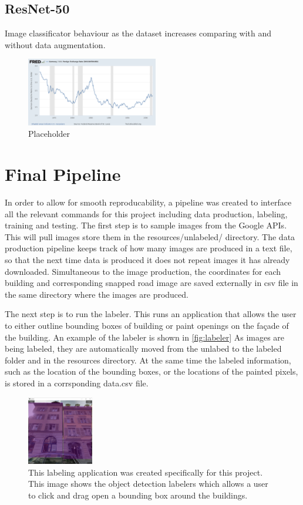 \documentclass[10pt,conference,compsocconf]{IEEEtran}
\begin{document}
\subsection{ResNet-50}
Image classificator behaviour as the dataset increases comparing with and without data augmentation.
\begin{figure}[h!]
  \centering
  \includegraphics[width=\columnwidth, height=30mm]{download.png}
  \vspace{-5mm}
  \caption{Placeholder}
  \label{fig:third}
\end{figure}

\section{Final Pipeline}
In order to allow for smooth reproducability, a pipeline was created to interface all the relevant commands for this project including data production, labeling, training and testing. The first step is to sample images from the Google APIs. This will pull images store them in the resources/unlabeled/ directory. The data production pipeline keeps track of how many images are produced in a text file, so that the next time data is produced it does not repeat images it has already downloaded. Simultaneous to the image production, the coordinates for each building and corresponding snapped road image are saved externally in csv file in the same directory where the images are produced.  

The next step is to run the labeler. This runs an application that allows the user to either outline bounding boxes of building or paint openings on the façade of the building. An example of the labeler is shown in \ref{fig:labeler} As images are being labeled, they are automatically moved from the unlabed to the labeled folder and in the resources directory. At the same time the labeled information, such as the location of the bounding boxes, or the locations of the painted pixels, is stored in a corrsponding data.csv file. 

\begin{figure}[h!]
  \centering
  \includegraphics[height=30mm]{labeler.png}
  \vspace{-5mm}
  \caption{This labeling application was created specifically for this project. This image shows the object detection labelers which allows a user to click and drag open a bounding box around the buildings.}
  \label{fig:lebeler}
\end{figure}
\end{document}
